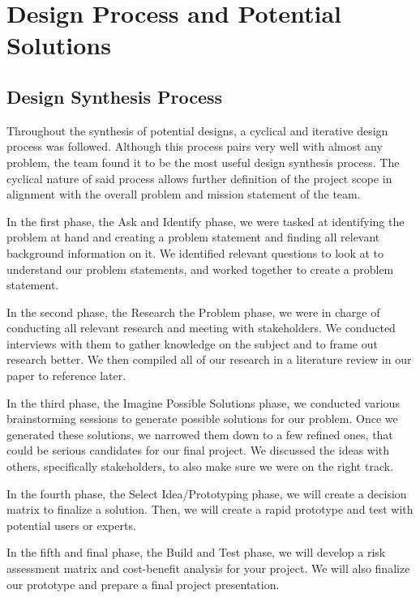 \documentclass[../main.tex]{subfiles}
\begin{document}
\section{Design Process and Potential Solutions}\label{designProcess}

\subsection{Design Synthesis Process}
Throughout the synthesis of potential designs, a cyclical and iterative design process was followed. Although this process pairs very well with almost any problem, the team found it to be the most useful design synthesis process. The cyclical nature of said process allows further definition of the project scope in alignment with the overall problem and mission statement of the team.\par
In the first phase, the Ask and Identify phase, we were tasked at identifying the problem at hand and creating a problem statement and finding all relevant background information on it. We identified relevant questions to look at to understand our problem statements, and worked together to create a problem statement. \par
In the second phase, the Research the Problem phase, we were in charge of conducting all relevant research and meeting with stakeholders. We conducted interviews with them to gather knowledge on the subject and to frame out research better. We then compiled all of our research in a literature review in our paper to reference later. \par
In the third phase, the Imagine Possible Solutions phase, we conducted various brainstorming sessions to generate possible solutions for our problem. Once we generated these solutions, we narrowed them down to a few refined ones, that could be serious candidates for our final project. We discussed the ideas with others, specifically stakeholders, to also make sure we were on the right track. \par
\newpage

In the fourth phase, the Select Idea/Prototyping phase, we will create a decision matrix to finalize a solution. Then, we will create a rapid prototype and test with potential users or experts. \par
In the fifth and final phase, the Build and Test phase, we will develop a risk assessment matrix and cost-benefit analysis for your project. We will also finalize our prototype and prepare a final project presentation. \par
\end{document}
